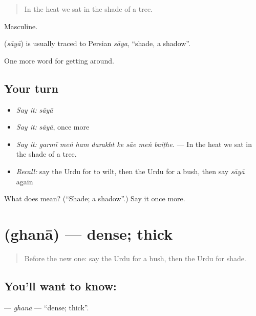 \begin{quote}
In the heat we sat in the shade of a tree.
\end{quote}

Masculine.

\begin{cousinweb}
\textbf{} (\emph{sāyā}) is usually traced to Persian \emph{sāya}, \textquotedblleft{}shade, a shadow\textquotedblright{}.
\end{cousinweb}

\begin{grammarlens}[title={What you've built}]
One more word for getting around.
\end{grammarlens}

\subsection*{Your turn}
\begin{itemize}
\raggedright
  \item \emph{Say it:} \emph{sāyā}
  \item \emph{Say it:} \emph{sāyā}, once more
  \item \emph{Say it:} \emph{garmī meṅ ham darakht ke sāe meṅ baiṭhe.} — In the heat we sat in the shade of a tree.
  \item \emph{Recall:} say the Urdu for to wilt, then the Urdu for a bush, then say \emph{sāyā} again
\end{itemize}

\begin{tcolorbox}[breakable,colback=teal!4,colframe=teal!35!black,title={Before you move on}]
What does  mean? (\textquotedblleft{}Shade; a shadow\textquotedblright{}.) Say it once more.
\end{tcolorbox}
\section[\texorpdfstring{\ur{گھنا} (ghanā)}{گھنا (ghanā)}]{ (ghanā) — dense; thick}

\label{lesson:UR-C437-ghana}



\begin{quote}
Before the new one: say the Urdu for a bush, then the Urdu for shade.
\end{quote}

\subsection*{You'll want to know: }
\textbf{} — \emph{ghanā} — \textquotedblleft{}dense; thick\textquotedblright{}.

